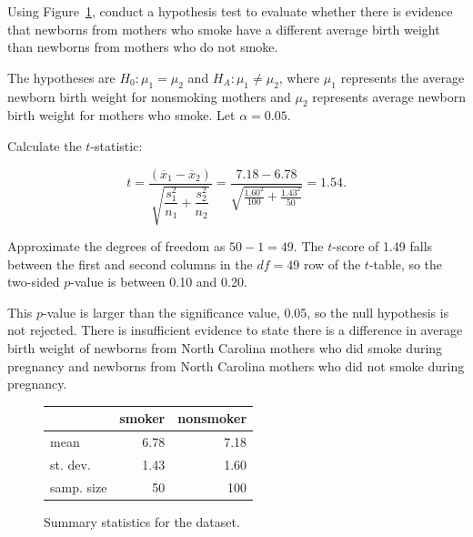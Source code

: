 \begin{examplewrap}
\begin{nexample}{Using Figure~\ref{summaryStatsBabySmoke}, conduct a hypothesis test to evaluate whether there is evidence that newborns from mothers who smoke have a different average birth weight than newborns from mothers who do not smoke.}

The hypotheses are $H_0: \mu_{1} = \mu_{2}$ and $H_A: \mu_{1} \neq \mu_{2}$, where $\mu_{1}$ represents the average newborn birth weight for nonsmoking mothers and $\mu_{2}$ represents average newborn birth weight for mothers who smoke. Let $\alpha = 0.05$. 	

Calculate the $t$-statistic:

\[t = \dfrac{(\overline{x}_1 - \overline{x}_2)}{\sqrt{\dfrac{s_{1}^{2}}{n_1} + \dfrac{s_{2}^{2}}{n_2}}} = \dfrac{7.18 - 6.78}{\sqrt{\frac{1.60^2}{100} + \frac{1.43^2}{50}}} = 1.54.\]

Approximate the degrees of freedom as $50 - 1 = 49$. The $t$-score of 1.49 falls between the first and second columns in the $df = 49$ row of the $t$-table, so the two-sided $p$-value is between 0.10 and 0.20.\footnotemark{}

This $p$-value is larger than the significance value, 0.05, so the null hypothesis is not rejected. There is insufficient evidence to state there is a difference in average birth weight of newborns from North Carolina mothers who did smoke during pregnancy and newborns from North Carolina mothers who did not smoke during pregnancy.
\end{nexample}
\end{examplewrap}

\begin{figure}[hhh]
	\centering
	\begin{tabular}{lrr}
		& smoker & nonsmoker \\
		\hline
		mean & 6.78 & 7.18 \\
		st. dev. & 1.43 & 1.60 \\
		samp. size & 50 & 100 \\
		\hline
	\end{tabular}
	\caption{Summary statistics for the  dataset.}
	\label{summaryStatsBabySmoke}
\end{figure}		




